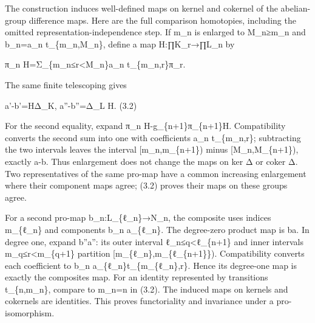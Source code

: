 The construction induces well-defined maps on kernel and cokernel of the abelian-group difference maps. Here are the full comparison homotopies,\allowbreak{} including the omitted representation-independence step. If m\_\allowbreak{}n is enlarged to M\_\allowbreak{}n≥m\_\allowbreak{}n and b\_\allowbreak{}n\allowbreak{}=a\_\allowbreak{}n t\_\allowbreak{}\{m\_\allowbreak{}n,\allowbreak{}M\_\allowbreak{}n\},\allowbreak{} define a map H:\allowbreak{}∏K\_\allowbreak{}r\allowbreak{}→∏L\_\allowbreak{}n by

π\_\allowbreak{}n H\allowbreak{}=Σ\_\allowbreak{}\{m\_\allowbreak{}n≤r<M\_\allowbreak{}n\}a\_\allowbreak{}n t\_\allowbreak{}\{m\_\allowbreak{}n,\allowbreak{}r\}π\_\allowbreak{}r.

The same finite telescoping gives

a'-b'\allowbreak{}=HΔ\_\allowbreak{}K,\allowbreak{} a''-b''\allowbreak{}=Δ\_\allowbreak{}L H. (3.2)\allowbreak{}

For the second equality,\allowbreak{} expand π\_\allowbreak{}n H-g\_\allowbreak{}\{n\allowbreak{}+1\}π\_\allowbreak{}\{n\allowbreak{}+1\}H. Compatibility converts the second sum into one with coefficients a\_\allowbreak{}n t\_\allowbreak{}\{m\_\allowbreak{}n,\allowbreak{}r\}; subtracting the two intervals leaves the interval [m\_\allowbreak{}n,\allowbreak{}m\_\allowbreak{}\{n\allowbreak{}+1\})\allowbreak{} minus [M\_\allowbreak{}n,\allowbreak{}M\_\allowbreak{}\{n\allowbreak{}+1\})\allowbreak{},\allowbreak{} exactly a\textquotesingle\textquotesingle-b\textquotesingle\textquotesingle. Thus enlargement does not change the maps on ker Δ or coker Δ. Two representatives of the same pro-map have a common increasing enlargement where their component maps agree; (3.2)\allowbreak{} proves their maps on these groups agree.

For a second pro-map b\_\allowbreak{}n:\allowbreak{}L\_\allowbreak{}\{ℓ\_\allowbreak{}n\}\allowbreak{}→N\_\allowbreak{}n,\allowbreak{} the composite uses indices m\_\allowbreak{}\{ℓ\_\allowbreak{}n\} and components b\_\allowbreak{}n a\_\allowbreak{}\{ℓ\_\allowbreak{}n\}. The degree-zero product map is b\textquotesingle a\textquotesingle. In degree one,\allowbreak{} expand b''a'':\allowbreak{} its outer interval ℓ\_\allowbreak{}n≤q<ℓ\_\allowbreak{}\{n\allowbreak{}+1\} and inner intervals m\_\allowbreak{}q≤r<m\_\allowbreak{}\{q\allowbreak{}+1\} partition [m\_\allowbreak{}\{ℓ\_\allowbreak{}n\},\allowbreak{}m\_\allowbreak{}\{ℓ\_\allowbreak{}\{n\allowbreak{}+1\}\})\allowbreak{}. Compatibility converts each coefficient to b\_\allowbreak{}n a\_\allowbreak{}\{ℓ\_\allowbreak{}n\}t\_\allowbreak{}\{m\_\allowbreak{}\{ℓ\_\allowbreak{}n\},\allowbreak{}r\}. Hence its degree-one map is exactly the composite\textquotesingle s map. For an identity represented by transitions t\_\allowbreak{}\{n,\allowbreak{}m\_\allowbreak{}n\},\allowbreak{} compare to m\_\allowbreak{}n\allowbreak{}=n in (3.2)\allowbreak{}. The induced maps on kernels and cokernels are identities. This proves functoriality and invariance under a pro-isomorphism.

